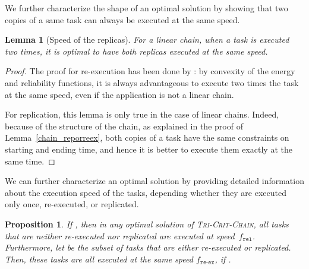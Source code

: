 \documentclass[a4paper]{article}
\theoremstyle{plain}
\newtheorem{lemma}{Lemma}
\newtheorem{proposition}{Proposition}
\theoremstyle{definition}
\theoremstyle{remark}
\newcommand{\fr}{\ensuremath{f_{\texttt{rel}}}\xspace}
\newcommand{\freex}{\ensuremath{f_{\texttt{re-ex}}}\xspace}
\newcommand{\chain}{\textsc{Tri-Crit-Chain}\xspace}
\begin{document}
We further characterize the shape of an optimal solution by showing
that two copies of a same task can always be executed at the same
speed. 
\begin{lemma}[Speed of the replicas]
  \label{lemma.speed.chain}
  For a linear chain, when a task is executed two times, it is optimal
  to have both replicas executed at the same speed.
\end{lemma}

\begin{proof}
  The proof for re-execution has been done by \cite{rr7757}: by
  convexity of the energy and reliability functions, it is always
  advantageous to execute two times the task at the same speed, even
  if the application is not a linear chain. 

  For replication, this lemma is only true in the case of linear
  chains. Indeed, because of the structure of the chain, as explained
  in the proof of Lemma~\ref{chain_reporreex}, both copies of a task
  have the same constraints on starting and ending time, and hence it
  is better to execute them exactly at the same time. 
\end{proof}



We can further characterize an optimal solution by providing detailed
information about the execution speed of the tasks, depending whether
they are executed only once, re-executed, or replicated. 
\begin{proposition}
  \label{prop_WC_fr}
  If , then in any optimal solution of
  \chain, all tasks that are neither
  re-executed nor replicated are executed at speed~\fr.  Furthermore, 
  let  be the subset of tasks that are either
  re-executed or replicated. Then, these tasks are all executed at the
  same speed \freex, if . 
\end{proposition}
\end{document}
